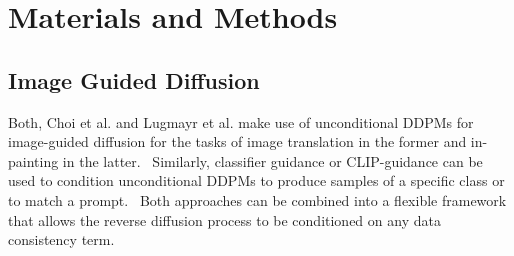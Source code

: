 %
\newpage
\chapter{Materials and Methods}
\section{Image Guided Diffusion}
Both, Choi et al. and Lugmayr et al. make use of unconditional DDPMs for image-guided diffusion for the tasks of image translation in the former and in-painting in the latter.~\autocite{choi2021ilvr,lugmayr2022repaint} Similarly, classifier guidance or CLIP-guidance can be used to condition unconditional DDPMs to produce samples of a specific class or to match a prompt.~\autocite{dhariwal2021diffusion} Both approaches can be combined into a flexible framework that allows the reverse diffusion process to be conditioned on any data consistency term.


